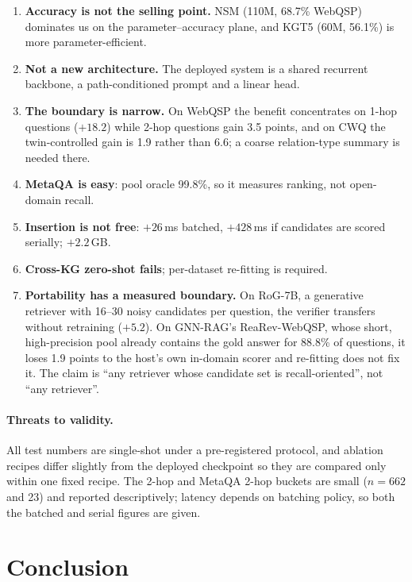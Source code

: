 \documentclass[sigconf,review]{acmart}
\begin{document}
\begin{enumerate}
\item \textbf{Accuracy is not the selling point.} NSM (110M, 68.7\% WebQSP) dominates us on the parameter--accuracy plane, and KGT5 (60M, 56.1\%) is more parameter-efficient.
\item \textbf{Not a new architecture.} The deployed system is a shared recurrent backbone, a path-conditioned prompt and a linear head.
\item \textbf{The boundary is narrow.} On WebQSP the benefit concentrates on 1-hop questions ($+18.2$) while 2-hop questions gain 3.5 points, and on CWQ the twin-controlled gain is 1.9 rather than 6.6; a coarse relation-type summary is needed there.
\item \textbf{MetaQA is easy}: pool oracle 99.8\%, so it measures ranking, not open-domain recall.
\item \textbf{Insertion is not free}: $+26$\,ms batched, $+428$\,ms if candidates are scored serially; $+2.2$\,GB.
\item \textbf{Cross-KG zero-shot fails}; per-dataset re-fitting is required.
\item \textbf{Portability has a measured boundary.} On RoG-7B, a generative retriever with 16--30 noisy candidates per question, the verifier transfers without retraining ($+5.2$). On GNN-RAG's ReaRev-WebQSP, whose short, high-precision pool already contains the gold answer for 88.8\% of questions, it loses 1.9 points to the host's own in-domain scorer and re-fitting does not fix it. The claim is ``any retriever whose candidate set is recall-oriented'', not ``any retriever''.
\end{enumerate}

\paragraph{Threats to validity.}
All test numbers are single-shot under a pre-registered protocol, and ablation recipes differ slightly from the deployed checkpoint so they are compared only within one fixed recipe. The 2-hop and MetaQA 2-hop buckets are small ($n=662$ and 23) and reported descriptively; latency depends on batching policy, so both the batched and serial figures are given.

\section{Conclusion}
\label{sec:conclusion}
\end{document}
